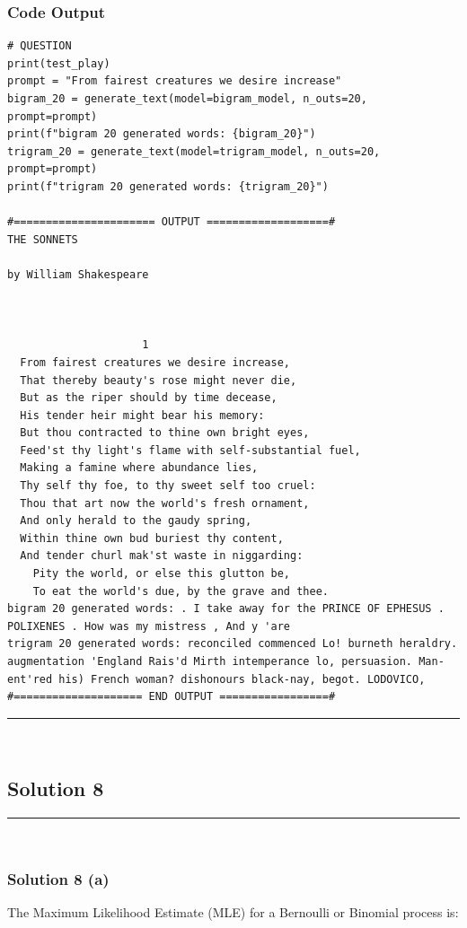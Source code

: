 \documentclass{article}
\begin{document}
\subsubsection*{Code Output}
\begin{lstlisting}
# QUESTION
print(test_play)
prompt = "From fairest creatures we desire increase"
bigram_20 = generate_text(model=bigram_model, n_outs=20, prompt=prompt) 
print(f"bigram 20 generated words: {bigram_20}")
trigram_20 = generate_text(model=trigram_model, n_outs=20, prompt=prompt) 
print(f"trigram 20 generated words: {trigram_20}")

#====================== OUTPUT ===================# 
THE SONNETS

by William Shakespeare



                     1
  From fairest creatures we desire increase,
  That thereby beauty's rose might never die,
  But as the riper should by time decease,
  His tender heir might bear his memory:
  But thou contracted to thine own bright eyes,
  Feed'st thy light's flame with self-substantial fuel,
  Making a famine where abundance lies,
  Thy self thy foe, to thy sweet self too cruel:
  Thou that art now the world's fresh ornament,
  And only herald to the gaudy spring,
  Within thine own bud buriest thy content,
  And tender churl mak'st waste in niggarding:
    Pity the world, or else this glutton be,
    To eat the world's due, by the grave and thee.
bigram 20 generated words: . I take away for the PRINCE OF EPHESUS . POLIXENES . How was my mistress , And y 'are
trigram 20 generated words: reconciled commenced Lo! burneth heraldry. augmentation 'England Rais'd Mirth intemperance lo, persuasion. Man-ent'red his) French woman? dishonours black-nay, begot. LODOVICO,
#==================== END OUTPUT =================#
\end{lstlisting}




\noindent\rule{\textwidth}{0.4pt}\\

\newpage

\subsection*{Solution 8}
\noindent\rule{\textwidth}{0.4pt}\\
\subsubsection*{Solution 8 (a)}
The Maximum Likelihood Estimate (MLE) for a Bernoulli or Binomial process is:
\end{document}
